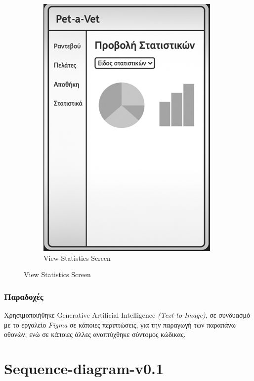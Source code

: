 \documentclass[12pt,a4paper,twoside]{book}
\begin{document}
\begin{figure}[H]
\begin{subfigure}[b]{0.48\textwidth}
        \includegraphics[width=\textwidth]{Mockup Screens/View_statistics.png}
        \caption{View Statistics Screen}\label{fig:mockup12}
    \end{subfigure}
\end{figure}

\subsection{Παραδοχές} %

Χρησιμοποιήθηκε Generative Artificial Intelligence \textit{(Text-to-Image)}, σε συνδυασμό με το εργαλείο \textit{Figma} σε κάποιες περιπτώσεις, για την παραγωγή των παραπάνω οθονών, ενώ σε κάποιες άλλες αναπτύχθηκε σύντομος κώδικας. %

\chapter{Sequence-diagram-v0.1}
\end{document}
